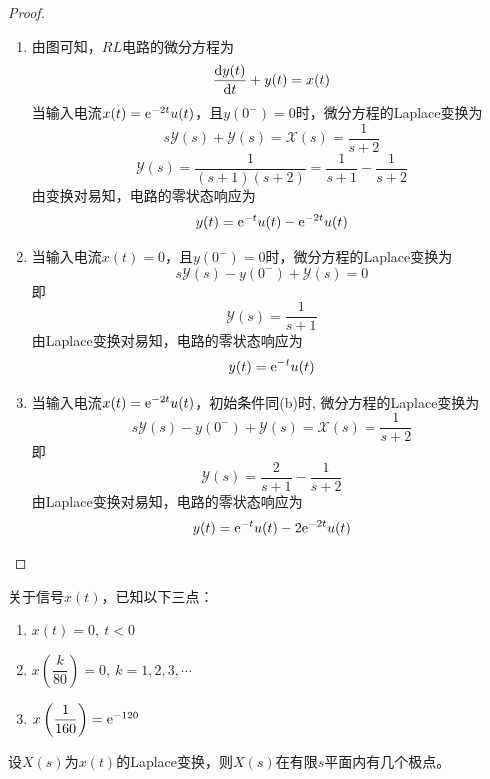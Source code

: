 \begin{proof}

    \begin{enumerate}

        \item 
            由图可知，$RL$电路的微分方程为
            $$\dfrac{\mathrm{d} y(t)}{\mathrm{d} t} + y(t) = x(t)$$
            当输入电流$x(t) = \mathrm{e}^{-2t}u(t)$，且$y(0^{-}) = 0$时，微分方程的\textup{Laplace}变换为
            $$s\mathscr{Y}(s) + \mathscr{Y}(s) = \mathscr{X}(s) = \dfrac{1}{s + 2}$$
            $$\mathscr{Y}(s) = \dfrac{1}{(s + 1)(s + 2)} = \dfrac{1}{s + 1} - \dfrac{1}{s + 2}$$
            由变换对易知，电路的零状态响应为
            $$y(t) = \mathrm{e}^{-t}u(t) - \mathrm{e}^{-2t}u(t)$$
        \item 
            当输入电流$x(t) = 0$，且$y(0^{-}) = 0$时，微分方程的\textup{Laplace}变换为
            $$s\mathscr{Y}(s) - y(0^{-}) + \mathscr{Y}(s) = 0$$
            即
            $$\mathscr{Y}(s) = \dfrac{1}{s + 1}$$
            由\textup{Laplace}变换对易知，电路的零状态响应为
            $$y(t) = \mathrm{e}^{-t}u(t)$$
        \item 
            当输入电流$x(t) =  \mathrm{e}^{-2t}u(t)$，初始条件同\textup{(b)}时,
            微分方程的\textup{Laplace}变换为
            $$s\mathscr{Y}(s) - y(0^{-}) + \mathscr{Y}(s) = \mathscr{X}(s) = \dfrac{1}{s + 2}$$
            即
            $$\mathscr{Y}(s) = \dfrac{2}{s + 1}  - \dfrac{1}{s + 2}$$
            由\textup{Laplace}变换对易知，电路的零状态响应为
            $$y(t) = \mathrm{e}^{-t}u(t) - 2\mathrm{e}^{-2t}u(t)$$
    \end{enumerate}

    
\end{proof}


\begin{proposition}
    
    关于信号$x(t)$，已知以下三点：
    
    \begin{enumerate}
        \item $x(t) = 0,\ t < 0$
        \item $x\left(\dfrac{k}{80}\right) = 0, \ k = 1, 2, 3, \cdots$
        \item $x\left(\dfrac{1}{160}\right) = \mathrm{e}^{-120}$
   \end{enumerate}

   设$X(s)$为$x(t)$的\textup{Laplace}变换，则$X(s)$在有限$s$平面内有几个极点。

\end{proposition}

